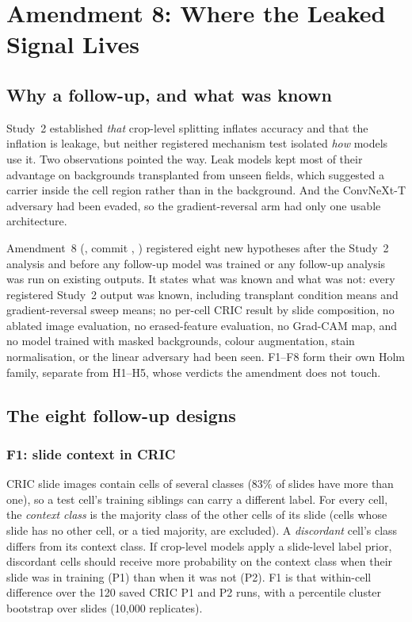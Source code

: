 \part{Amendment 8: Where the Leaked Signal Lives}

\chapter{Why a follow-up, and what was known}
\label{r:ch:a8-why}

Study~2 established \emph{that} crop-level splitting inflates accuracy and that the inflation is leakage, but neither
registered mechanism test isolated \emph{how} models use it. Two observations pointed the way. Leak models kept most of
their advantage on backgrounds transplanted from unseen fields, which suggested a carrier inside the cell region rather
than in the background. And the ConvNeXt-T adversary had been evaded, so the gradient-reversal arm had only one usable
architecture.

Amendment~8 (, commit \texttt{\FollowupCommit}, \FollowupTime) registered
eight new hypotheses after the Study~2 analysis and before any follow-up model was trained or any follow-up analysis was
run on existing outputs. It states what was known and what was not: every registered Study~2 output was known, including
transplant condition means and gradient-reversal sweep means; no per-cell CRIC result by slide composition, no ablated
image evaluation, no erased-feature evaluation, no Grad-CAM map, and no model trained with masked backgrounds, colour
augmentation, stain normalisation, or the linear adversary had been seen. F1--F8 form their own Holm family, separate from
H1--H5, whose verdicts the amendment does not touch.



\chapter{The eight follow-up designs}
\label{r:ch:a8-designs}

\section{F1: slide context in CRIC}

CRIC slide images contain cells of several classes (83\% of slides have more than one), so a test cell's training
siblings can carry a different label. For every cell, the \emph{context class} is the majority class of the other cells
of its slide (cells whose slide has no other cell, or a tied majority, are excluded). A \emph{discordant} cell's class
differs from its context class. If crop-level models apply a slide-level label prior, discordant cells should receive more
probability on the context class when their slide was in training (P1) than when it was not (P2). F1 is that within-cell
difference over the 120 saved CRIC P1 and P2 runs, with a percentile cluster bootstrap over slides (10,000 replicates).

